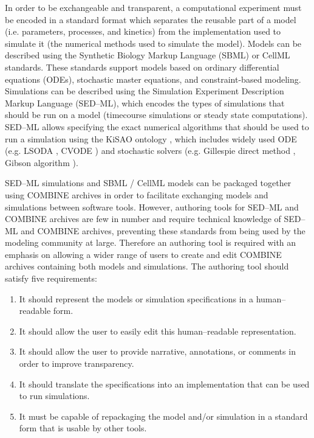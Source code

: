 \documentclass[10pt,letterpaper]{article}
\begin{document}
In order to be exchangeable and transparent, a computational experiment must be encoded in a standard format which separates the reusable part of a model (i.e. parameters, processes, and kinetics) from the implementation used to simulate it (the numerical methods used to simulate the model). Models can be described using the Synthetic Biology Markup Language (SBML) or CellML standards. These standards support models based on ordinary differential equations (ODEs), stochastic master equations, and constraint-based modeling. Simulations can be described using the Simulation Experiment Description Markup Language (SED--ML), which encodes the types of simulations that should be run on a model (timecourse simulations or steady state computations). SED--ML allows specifying the exact numerical algorithms that should be used to run a simulation using the KiSAO ontology \cite{courtot2011controlled}, which includes widely used ODE (e.g. LSODA \cite{petzold1989computing}, CVODE \cite{cohen1996cvode}) and stochastic solvers (e.g. Gillespie direct method \cite{gillespie1977exact}, Gibson algorithm \cite{gibson2000efficient}).


SED--ML simulations and SBML / CellML models can be packaged together using COMBINE archives \cite{bergmann2014combine} in order to facilitate exchanging models and simulations between software tools. However, authoring tools for SED--ML and COMBINE archives are few in number \cite{bergmann2017sed,scharm2014combinearchiveweb} and require technical knowledge of SED--ML and COMBINE archives, preventing these standards from being used by the modeling community at large. Therefore an authoring tool is required with an emphasis on allowing a wider range of users to create and edit COMBINE archives containing both models and simulations. The authoring tool should satisfy five requirements:

\begin{enumerate}
\item It should represent the models or simulation specifications in a human--readable form.
\item It should allow the user to easily edit this human--readable representation.
\item It should allow the user to provide narrative, annotations, or comments in order to improve transparency.
\item It should translate the specifications into an implementation that can be used to run simulations.
\item It must be capable of repackaging the model and/or simulation in a standard form that is usable by other tools.
\end{enumerate}
\end{document}
